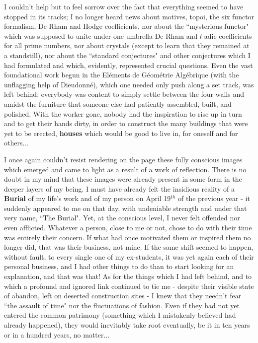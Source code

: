 I couldn't help but to feel sorrow over the fact that everything seemed to have stopped in its tracks; I no longer heard news about motives, topoi, the six functor formalism, De Rham and Hodge coefficients, nor about the ``mysterious functor" which was supposed to unite under one umbrella De Rham and $l$-adic coefficients for all prime numbers, nor about crystals (except to learn that they remained at a standstill), nor about the ``standard conjectures" and other conjectures which I had formulated and which, evidently, represented crucial questions. Even the vast foundational work begun in the El\'ements de G\'eom\'etrie Alg\'ebrique (with the unflagging help of Dieudonn\'e), which one needed only push along a set track, was left behind: everybody was content to simply settle between the four walls and amidst the furniture that someone else had patiently assembled, built, and polished. With the worker gone, nobody had the inspiration to rise up in turn and to get their hands dirty, in order to construct the many buildings that were yet to be erected, \textbf{houses} which would be good to live in, for oneself and for others...

I once again couldn't resist rendering on the page these fully conscious images which emerged and came to light as a result of a work of reflection. There is no doubt in my mind that these images were already present in some form in the deeper layers of my being. I must have already felt the insidious reality of a \textbf{Burial} of my life's work and of my person on April 19$^{th}$ of the previous year - it suddenly appeared to me on that day, with undeniable strength and under that very name, ``The Burial". Yet, at the conscious level, I never felt offended nor even afflicted. Whatever a person, close to me or not, chose to do with their time was entirely their concern. If what had once motivated them or inspired them no longer did, that was their business, not mine. If the same shift seemed to happen, without fault, to every single one of my ex-students, it was yet again each of their personal business, and I had other things to do than to start looking for an explanation, and that was that! As for the things which I had left behind, and to which a profound and ignored link continued to tie me - despite their visible state of abandon, left on deserted construction sites - I knew that they needn't fear ``the assault of time" nor the fluctuations of fashion. Even if they had not yet entered the common patrimony (something which I mistakenly believed had already happened), they would inevitably take root eventually, be it in ten years or in a hundred years, no matter...

